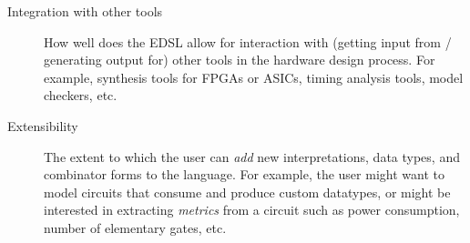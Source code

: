 \begin{description}
            \item[Integration with other tools] How well does the \ac{EDSL} allow for interaction with
            (getting input from / generating output for) other tools in the hardware design process.
            For example, synthesis tools for FPGAs or ASICs, timing analysis tools, model checkers,
            etc.

            \item[Extensibility] The extent to which the user can \emph{add} new interpretations,
            data types, and combinator forms to the language. For example, the user might want to
            model circuits that consume and produce custom datatypes, or might be interested in
            extracting \emph{metrics} from a circuit such as power consumption, number of elementary
            gates, etc.

        \end{description}

